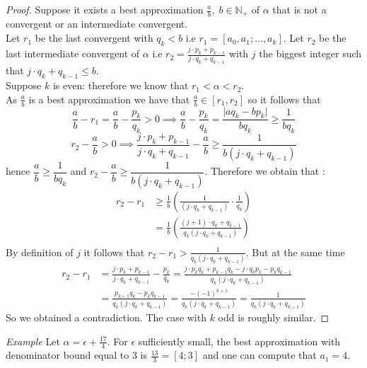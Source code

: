 \documentclass[a4paper,11pt,american]{article}
\newcommand{\N}{\mathbb{N}}
\theoremstyle{plain}
\theoremstyle{definition}
\begin{document}
\begin{proof}
    Suppose it exists a best approximation $\frac{a}{b},\; b\in\N_+$  of $\alpha$ that is not a convergent or an intermediate convergent.\\
    Let $r_1$ be the last convergent with $q_k<b$ i.e $r_1=[a_0,a_1;\dots,a_k]$. Let $r_2$ be the last intermediate convergent of $\alpha$ i.e $r_2=\frac{j\cdot p_k+p_{k-1}}{j\cdot q_k+q_{k-1}}$ with $j$ the biggest integer such that $j\cdot q_k+q_{k-1}\leq b$.\\
    Suppose $k$ is even: therefore we know that $r_1<\alpha<r_2$.\\
    As $\frac{a}{b}$ is a best approximation we have that $\frac{a}{b}\in [r_1,r_2]$ so it follows that 
    \begin{equation}
        \frac{a}{b}-r_1=\frac{a}{b}-\frac{p_k}{q_k}>0\implies \frac{a}{b}-\frac{p_k}{q_k}=\frac{\vert a q_k-b p_k\vert}{b q_k}\geq \frac{1}{bq_k}
    \end{equation}
    \begin{equation}r_2-\frac{a}{b}>0\implies \frac{j\cdot p_k+p_{k-1}}{j\cdot q_k+q_{k-1}}-\frac{a}{b}\geq \frac{1}{b(j\cdot q_k+q_{k-1})}
    \end{equation}
    hence $\dfrac{a}{b}\geq \dfrac{1}{bq_k}$ and $r_2-\dfrac{a}{b}\geq \dfrac{1}{b(j\cdot q_k+q_{k-1})}$. Therefore we obtain that :\begin{align*}
        r_2-r_1&\geq \frac{1}{b}(\frac{1}{(j\cdot q_k+q_{k-1})}\cdot \frac{1}{q_k})\\
        &=\frac{1}{b}(\frac{(j+1)\cdot q_k+q_{k-1}}{q_k(j\cdot q_k+q_{k-1})})\\
    \end{align*}
    By definition of $j$ it follows that $r_2-r_1>\frac{1}{q_k(j\cdot q_k+q_{k-1})}$.
    But at the same time\begin{align*}
        r_2-r_1&= \frac{j\cdot p_k+p_{k-1}}{j\cdot q_k+q_{k-1}}-\frac{p_k}{q_k}=\frac{j\cdot p_kq_k+p_{k-1}q_k-j\cdot q_kp_k-p_kq_{k-1}}{q_k(j\cdot q_k+q_{k-1})}\\
        &=\frac{p_{k-1}q_k-p_kq_{k-1}}{q_k(j\cdot q_k+q_{k-1})}=\frac{-(-1)^{k+1}}{q_k(j\cdot q_k+q_{k-1})}=\frac{1}{q_k(j\cdot q_k+q_{k-1})}
    \end{align*}
    So we obtained a contradiction. The case with $k$ odd is roughly similar.
\end{proof}
\emph{Example} Let $\alpha=\epsilon+\frac{17}{4}$. For $\epsilon$ sufficiently small, the best approximation with denominator bound equal to 3 is $\frac{13}{3}=[4;3]$ and one can compute that $a_1=4$.
\end{document}
